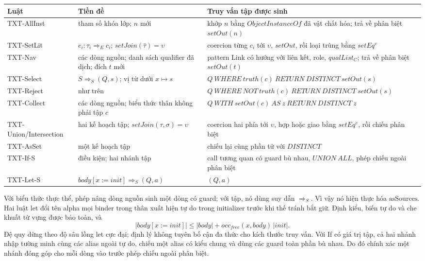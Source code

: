 \documentclass[11pt,a4paper]{article}
\theoremstyle{definition}
\newcommand{\asSources}{\mathrm{asSources}}
\begin{document}
\begin{longtable}{p{}p{}p{}}
\toprule Luật & Tiền đề & Truy vấn tập được sinh\\ \midrule
TXT-AllInst & tham số khóa lớp; $n$ mới & khớp $n$ bằng $ObjectInstanceOf$ đã vật chất hóa; trả về phân biệt $setOut(n)$\\
TXT-SetLit & $e_i:\tau_i\Rightarrow_E c_i$; $setJoin(\bar\tau)=\upsilon$ & coercion từng $c_i$ tới $\upsilon$, $setOut$, rồi loại trùng bằng $setEq^\upsilon$\\
TXT-Nav & các dòng nguồn; danh sách qualifier đã dịch; đích $t$ mới & pattern Link có hướng với liên kết, role, $qualList_C$; trả về phân biệt $setOut(t)$\\
TXT-Select & $S\Rightarrow_S(Q,s)$; vị từ dưới $x\mapsto s$ & $Q\ WHERE\ truth(c)\ RETURN\ DISTINCT\ setOut(s)$\\
TXT-Reject & như trên & $Q\ WHERE\ NOT\ truth(c)\ RETURN\ DISTINCT\ setOut(s)$\\
TXT-Collect & các dòng nguồn; biểu thức thân không phải tập $c$ & $Q\ WITH\ setOut(c)\ AS\ z\ RETURN\ DISTINCT\ z$\\
TXT-Union/Intersection & hai kế hoạch tập; $setJoin(\tau,\sigma)=\upsilon$ & coercion hai phía tới $\upsilon$, hợp hoặc giao bằng $setEq^\upsilon$, rồi chiếu phân biệt\\
TXT-AsSet & một kế hoạch tập & chiếu lại cùng phần tử với $DISTINCT$\\
TXT-If-S & điều kiện; hai nhánh tập & call tương quan có guard bù nhau, $UNION\ ALL$, phép chiếu ngoài phân biệt\\
TXT-Let-S & $body[x:=init]\Rightarrow_S(Q,a)$ & $(Q,a)$\\
\bottomrule
\end{longtable}
\endgroup

Với biểu thức thực thể, phép nâng dòng nguồn sinh một dòng có guard; với tập, nó
dùng suy dẫn $\Rightarrow_S$. Vì vậy nó hiện thực hóa $\asSources$. Hai luật
let đổi tên alpha mọi binder trong thân xuất hiện tự do trong initializer trước
khi thế tránh bắt giữ. Định kiểu, biến tự do và che khuất từ vựng được bảo toàn,
và
\[
|body[x:=init]|\leq |body|+occ_{free}(x,body)\,|init|.
\]
Đệ quy dừng theo độ sâu lồng let cực đại; định lý không tuyên bố cận đa thức cho
kích thước truy vấn. Với If có giá trị tập, cả hai nhánh nhập tường minh cùng
các alias ngoài tự do, chiếu một alias có kiểu chung và dùng các guard toàn
phần bù nhau. Do đó chính xác một nhánh đóng góp cho mỗi dòng vào trước phép
chiếu ngoài phân biệt.
\end{document}
